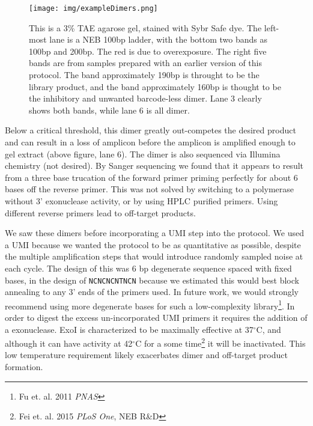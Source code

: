 {\begin{figure}[h!]
  \centering
  \texttt{[image: img/exampleDimers.png]}
  \caption{This is a 3\% TAE agarose gel, stained with Sybr Safe dye.
    The left-most lane is a NEB 100bp ladder, with the bottom 
    two bands as 100bp and 200bp. The red is due to overexposure.
    The right five bands are from samples prepared with an earlier
    version of this protocol. The band approximately 190bp is
    throught to be the library product, and the band approximately
    160bp is thought to be the inhibitory and unwanted 
    barcode-less dimer. Lane 3 clearly shows both bands, while lane
    6 is all dimer.}
  \label{fig:dimer}
\end{figure}

Below a critical threshold, this dimer greatly out-competes the desired
product and can result in a loss of amplicon before the amplicon is
amplified enough to gel extract (above figure, lane 6). The dimer is
also sequenced via Illumina chemistry (not desired). By Sanger
sequencing we found that it appears to result from a three base
trucation of the forward primer priming perfectly for about 6 bases off
the reverse primer. This was not solved by switching to a polymerase
without 3' exonuclease activity, or by using HPLC purified primers.
Using different reverse primers lead to off-target products.

We saw these dimers before incorporating a UMI step into the protocol.
We used a UMI because we wanted the protocol to be as quantitative as
possible, despite the multiple amplification steps that would introduce
randomly sampled noise at each cycle. The design of this was 6 bp
degenerate sequence spaced with fixed bases, in the design of
\texttt{NCNCNCNTNCN} because we estimated this would best block
annealing to any 3' ends of the primers used. In future work, we would
strongly recommend using more degenerate bases for such a low-complexity
library\footnote{Fu et. al. 2011 \emph{PNAS}}. In order to digest the
excess un-incorporated UMI primers it requires the addition of a
exonuclease. ExoI is characterized to be maximally effective at
37\(^{\circ}\)C, and although it can have activity at 42\(^{\circ}\)C
for a some time\footnote{Fei et. al. 2015 \emph{PLoS One}, NEB R\&D} it
will be inactivated. This low temperature requirement likely exacerbates
dimer and off-target product formation.

}
